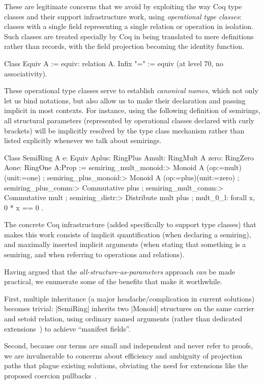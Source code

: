 \documentclass{llncs}
\begin{document}
These are legitimate concerns that we avoid by exploiting the way Coq type classes and their support infrastructure work, using \emph{operational type classes}: classes with a single field representing a single relation or operation in isolation. Such classes are treated specially by Coq in being translated to mere definitions rather than records, with the field projection becoming the identity function.
\begin{code}
 Class Equiv A := equiv: relation A.
 Infix "=" := equiv (at level 70, no associativity).
\end{code}
These operational type classes serve to establish \emph{canonical names}, which not only let us bind notations, but also allow us to make their declaration and passing implicit in most contexts. For instance, using the following definition of semirings, all structural parameters (represented by operational classes declared with curly brackets) will be implicitly resolved by the type class mechanism rather than listed explicitly whenever we talk about semirings.
\begin{code}
Class SemiRing A {e: Equiv A}{plus: RingPlus A}{mult: RingMult A}
                 {zero: RingZero A}{one: RingOne A}:Prop :=
  { semiring_mult_monoid:> Monoid A (op:=mult)(unit:=one)
  ; semiring_plus_monoid:> Monoid A (op:=plus)(unit:=zero)
  ; semiring_plus_comm:> Commutative plus
  ; semiring_mult_comm:> Commutative mult
  ; semiring_distr:> Distribute mult plus
  ; mult_0_l: forall x, 0 * x == 0 }.
\end{code}
The concrete Coq infrastructure (added specifically to support type classes) that makes this work consists of implicit quantification (when declaring a semiring), and maximally inserted implicit arguments (when stating that something is a semiring, and when referring to operations and relations).

Having argued that the \emph{all-structure-as-parameters} approach \emph{can} be made practical, we enumerate some of the benefits that make it worthwhile.

First, multiple inheritance (a major headache/complication in current solutions) becomes trivial: |SemiRing| inherits two |Monoid| structures on the same carrier and setoid relation, using ordinary named arguments (rather than dedicated extensions~\cite{DBLP:conf/types/Luo08}) to achieve ``manifest fields''.

Second, because our terms are small and independent and never refer to proofs, we are invulnerable to concerns about efficiency and ambiguity of projection paths that plague existing solutions, obviating the need for extensions like the proposed coercion pullbacks~\cite{Hints}.
\end{document}
